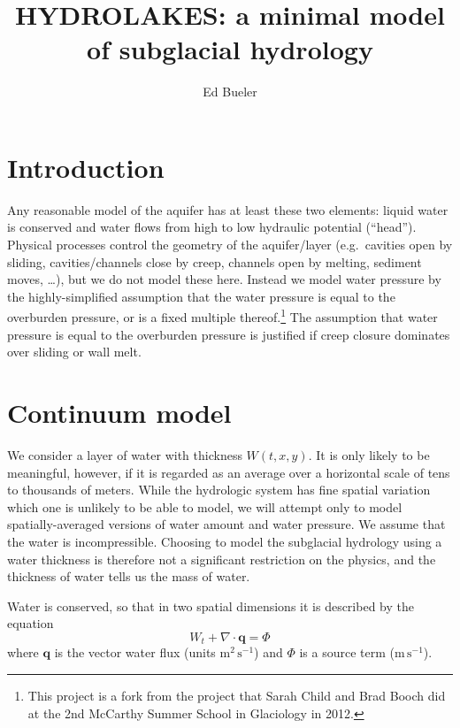 \documentclass[12pt,final]{amsart}%
\title[]{HYDROLAKES:  a minimal model of subglacial hydrology}
\author[]{Ed Bueler}
\newcommand\bq{\mathbf{q}}
\newcommand{\Div}{\nabla\cdot}
\begin{document}
\maketitle

\thispagestyle{empty}


\section{Introduction}

Any reasonable model of the aquifer has at least these two elements: liquid water is conserved and water flows from high to low hydraulic potential (``head'').  Physical processes control the geometry of the aquifer/layer (e.g.~cavities open by sliding, cavities/channels close by creep, channels open by melting, sediment moves, \dots), but we do not model these here.  Instead we model water pressure by the highly-simplified assumption that the water pressure is equal to the overburden pressure, or is a fixed multiple thereof.\footnote{This project is a fork from the project that Sarah Child and Brad Booch did at the 2nd McCarthy Summer School in Glaciology in 2012.}  The assumption that water pressure is equal to the overburden pressure is justified if creep closure dominates over sliding or wall melt.


\section{Continuum model}

We consider a layer of water with thickness $W(t,x,y)$.  It is only likely to be meaningful, however, if it is regarded as an average over a horizontal scale of tens to thousands of meters.  While the hydrologic system has fine spatial variation which one is unlikely to be able to model, we will attempt only to model spatially-averaged versions of water amount and water pressure.  We assume that the water is incompressible.  Choosing to model the subglacial hydrology using a water thickness is therefore not a significant restriction on the physics, and the thickness of water tells us the mass of water.

Water is conserved, so that in two spatial dimensions it is described by the equation \citep{Clarke05}
\begin{equation} \label{eq:conserve}
W_t + \Div \bq = \Phi
\end{equation}
where $\bq$ is the vector water flux (units $\text{m}^2\,\text{s}^{-1}$) and $\Phi$ is a source term ($\text{m}\,\text{s}^{-1}$).
\end{document}
